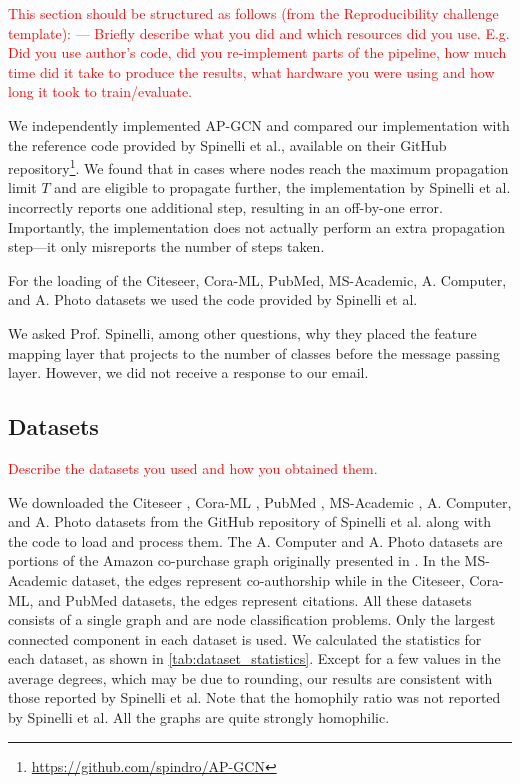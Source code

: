 \documentclass{gdl}
\begin{document}
\textcolor{red}{
This section should be structured as follows (from the Reproducibility challenge template):
---
Briefly describe what you did and which resources did you use. E.g. Did you use author's code, did you re-implement parts of the pipeline, how much time did it take to produce the results, what hardware you were using and how long it took to train/evaluate. }

We independently implemented AP-GCN and compared our implementation with the reference code provided by Spinelli et al., available on their GitHub repository\footnote{\url{https://github.com/spindro/AP-GCN}}. We found that in cases where nodes reach the maximum propagation limit $T$ and are eligible to propagate further, the implementation by Spinelli et al. incorrectly reports one additional step, resulting in an off-by-one error. Importantly, the implementation does not actually perform an extra propagation step—it only misreports the number of steps taken.

For the loading of the Citeseer, Cora-ML, PubMed, MS-Academic, A. Computer, and A. Photo datasets we used the code provided by Spinelli et al.

We asked Prof. Spinelli, among other questions, why they placed the feature mapping layer that projects to the number of classes before the message passing layer. However, we did not receive a response to our email.

\subsection{Datasets}
\textcolor{red}{Describe the datasets you used and how you obtained them. }

We downloaded the Citeseer \cite{sen2008}, Cora-ML \cite{mccallum2000}, PubMed \cite{namata2012}, MS-Academic \cite{shchur2018}, A. Computer, and A. Photo datasets from the GitHub repository of Spinelli et al. along with the code to load and process them. The A. Computer and A. Photo datasets are portions of the Amazon co-purchase graph originally presented in \cite{mcauley2015}. In the MS-Academic dataset, the edges represent co-authorship while in the Citeseer, Cora-ML, and PubMed datasets, the edges represent citations. All these datasets consists of a single graph and are node classification problems. Only the largest connected component in each dataset is used. We calculated the statistics for each dataset, as shown in \autoref{tab:dataset_statistics}. Except for a few values in the average degrees, which may be due to rounding, our results are consistent with those reported by Spinelli et al. Note that the homophily ratio was not reported by Spinelli et al. All the graphs are quite strongly homophilic.
\end{document}
